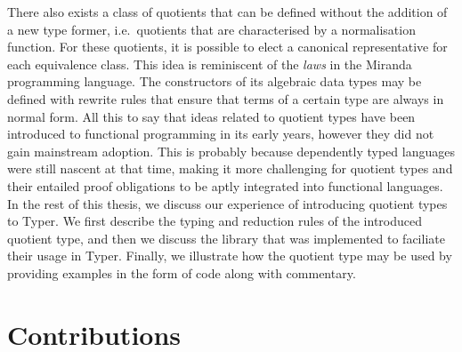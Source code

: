 \documentclass[12pt,twoside,maitrise]{dms}
\theoremstyle{definition}
\numberwithin{equation}{section}
\numberwithin{table}{chapter}
\numberwithin{figure}{chapter}
\begin{document}

There also exists a class of quotients that can be defined without the addition
of a new type former, i.e.\ quotients that are characterised by a normalisation
function\cite{li2015quotient,courtieu-normalizedtypes}. For these quotients, it
is possible to elect a canonical representative for each equivalence class. This
idea is reminiscent of the \emph{laws} in the Miranda programming
language\cite{thompson1986laws}. The constructors of its algebraic data types
may be defined with rewrite rules that ensure that terms of a certain type are
always in normal form. All this to say that ideas related to quotient types have
been introduced to functional programming in its early years, however they did
not gain mainstream adoption. This is probably because dependently typed
languages were still nascent at that time, making it more challenging for
quotient types and their entailed proof obligations to be aptly integrated into
functional languages. In the rest of this thesis, we discuss our experience of
introducing quotient types to Typer. We first describe the typing and reduction
rules of the introduced quotient type, and then we discuss the library that was
implemented to faciliate their usage in Typer. Finally, we illustrate how the
quotient type may be used by providing examples in the form of code along with
commentary.

\section{Contributions}
\end{document}
